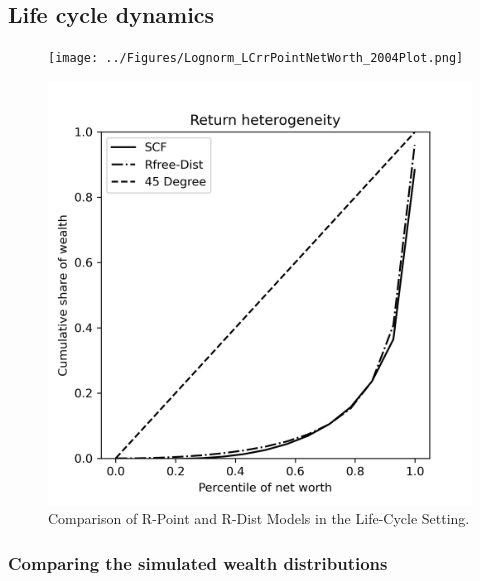 \par


\par

\subsection{Life cycle dynamics}

\par 

\begin{figure}[h]
    \centering
    \begin{minipage}{0.48\textwidth}
        \centering
        \texttt{[image: ../Figures/Lognorm\_LCrrPointNetWorth\_2004Plot.png]}
    \end{minipage}
    \hfill
    \begin{minipage}{0.48\textwidth}
        \centering
        \includegraphics[width=\textwidth]{../Figures/Lognorm_LCrrDistNetWorth_2004Plot.png}
    \end{minipage}
    \caption{Comparison of R-Point and R-Dist Models in the Life-Cycle Setting.}
    \label{fig:LCLognorm} 
\end{figure}


\par


\subsubsection{Comparing the simulated wealth distributions}

